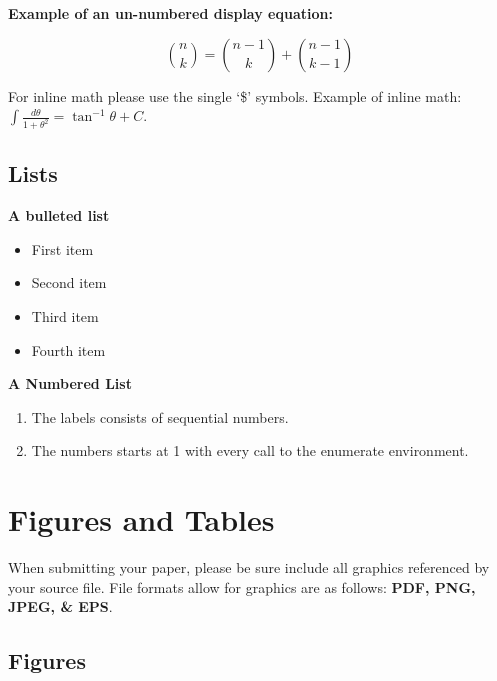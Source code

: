 \documentclass{csmagazine}
\begin{document}
\begin{flushleft}
\textbf{Example of an un-numbered display equation:}

\[\binom{n}{k} =\binom{n-1}{k} + \binom{n-1}{k-1}\]


For inline math please use the single `\$' symbols. Example of inline math: $\int\frac{d\theta} {1+\theta^2}=\tan^{-1} \theta+C$.

\subsection{Lists}

\textbf{A bulleted list}

\begin{itemize}
	\itemsep0em 
	\item First item
	\item Second item
	\item Third item
	\item Fourth item
\end{itemize}

\textbf{A Numbered List}

\begin{enumerate}
	\item The labels consists of sequential numbers.
	\item The numbers starts at 1 with every call to the enumerate environment.
\end{enumerate}




\section{Figures and Tables}

When submitting your paper, please be sure include all graphics referenced by your source file. File formats allow for graphics are as follows: \textbf{PDF, PNG, JPEG, \& EPS}.

\subsection{Figures}


\end{flushleft}
\end{document}
